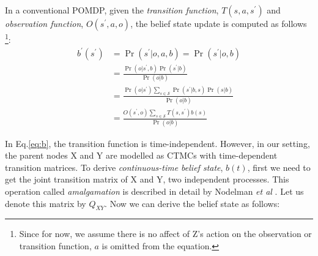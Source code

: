 In a conventional POMDP, given the \textit{transition function}, $ T(s, a, s^{\prime})$  and \textit{observation function}, $ O(s^{\prime}, a, o) $, the belief state update is computed as follows \cite{Kaelbling2011} \footnote{Since for now, we assume there is no affect of Z's action on the observation or transition function, $ a $ is omitted from the equation.}:
\begin{equation}
\begin{aligned}
b^{\prime}\left(s^{\prime}\right) &=\operatorname{Pr}\left(s^{\prime} | o, a, b\right) =\operatorname{Pr}\left(s^{\prime} | o, b\right) \\
&=\frac{\operatorname{Pr}\left(o | s^{\prime}, b\right) \operatorname{Pr}\left(s^{\prime} | b\right)}{\operatorname{Pr}(o | b)} \\
&=\frac{\operatorname{Pr}\left(o | s^{\prime}\right) \sum_{s \in \mathcal{S}} \operatorname{Pr}\left(s^{\prime} | b, s\right) \operatorname{Pr}(s | b)}{\operatorname{Pr}(o | b)} \\
&=\frac{O\left(s^{\prime}, o\right) \sum_{s \in \mathcal{S}} T\left(s, s^{\prime}\right) b(s)}{\operatorname{Pr}(o | b)}
\end{aligned}
\label{eq:b}
\end{equation}

In Eq.\ref{eq:b}, the transition function is time-independent. However, in our setting, the parent nodes X and Y are modelled as CTMCs with time-dependent transition matrices. To derive \textit{continuous-time belief state}, $ b(t) $, first we need to get the joint transition matrix of X and Y, two independent processes. This operation called \textit{amalgamation} is described in detail by Nodelman \textit{et al} \cite{Nodelman1995}. Let us denote this matrix by $ Q_{XY} $. 
Now we can derive the belief state as follows: 

